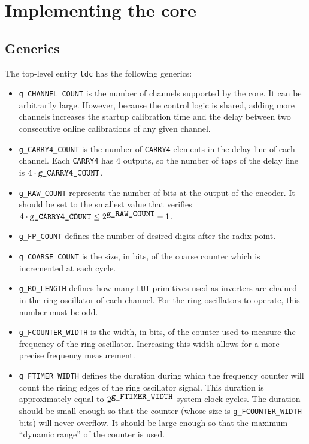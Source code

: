 \documentclass[a4paper,11pt]{article}
\begin{document}
\section{Implementing the core}
\subsection{Generics}
The top-level entity \verb!tdc! has the following generics:
\begin{itemize}
\item \verb!g_CHANNEL_COUNT! is the number of channels supported by the core. It can be arbitrarily large. However, because the control logic is shared, adding more channels increases the startup calibration time and the delay between two consecutive online calibrations of any given channel.
\item \verb!g_CARRY4_COUNT! is the number of \verb!CARRY4! elements in the delay line of each channel. Each \verb!CARRY4! has 4 outputs, so the number of taps of the delay line is $4 \cdot \verb!g_CARRY4_COUNT!$.
\item \verb!g_RAW_COUNT! represents the number of bits at the output of the encoder. It should be set to the smallest value that verifies $4\cdot \verb!g_CARRY4_COUNT! \le 2^{\verb!g_RAW_COUNT!}-1$.
\item \verb!g_FP_COUNT! defines the number of desired digits after the radix point.
\item \verb!g_COARSE_COUNT! is the size, in bits, of the coarse counter which is incremented at each cycle.
\item \verb!g_RO_LENGTH! defines how many \verb!LUT! primitives used as inverters are chained in the ring oscillator of each channel. For the ring oscillators to operate, this number must be odd.
\item \verb!g_FCOUNTER_WIDTH! is the width, in bits, of the counter used to measure the frequency of the ring oscillator. Increasing this width allows for a more precise frequency measurement.
\item \verb!g_FTIMER_WIDTH! defines the duration during which the frequency counter will count the rising edges of the ring oscillator signal. This duration is approximately equal to $2^{\verb!g_FTIMER_WIDTH!}$ system clock cycles. The duration should be small enough so that the counter (whose size is \verb!g_FCOUNTER_WIDTH! bits) will never overflow. It should be large enough so that the maximum ``dynamic range'' of the counter is used.
\end{itemize}
\end{document}
